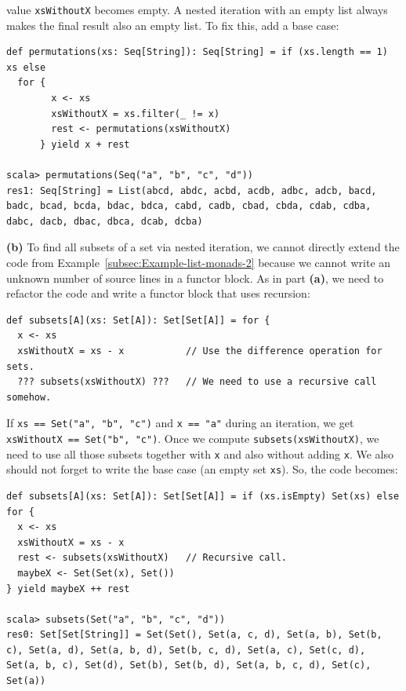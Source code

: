 value \lstinline!xsWithoutX! becomes empty. A nested iteration with
an empty list always makes the final result also an empty list. To
fix this, add a base case:
\begin{lstlisting}
def permutations(xs: Seq[String]): Seq[String] = if (xs.length == 1) xs else
  for {
        x <- xs
        xsWithoutX = xs.filter(_ != x)
        rest <- permutations(xsWithoutX)
      } yield x + rest

scala> permutations(Seq("a", "b", "c", "d"))
res1: Seq[String] = List(abcd, abdc, acbd, acdb, adbc, adcb, bacd, badc, bcad, bcda, bdac, bdca, cabd, cadb, cbad, cbda, cdab, cdba, dabc, dacb, dbac, dbca, dcab, dcba) 
\end{lstlisting}

\textbf{(b)} To find all subsets of a set via nested iteration, we
cannot directly extend the code from Example~\ref{subsec:Example-list-monads-2}
because we cannot write an unknown number of source lines in a functor
block. As in part \textbf{(a)}, we need to refactor the code and write
a functor block that uses recursion:
\begin{lstlisting}
def subsets[A](xs: Set[A]): Set[Set[A]] = for {
  x <- xs
  xsWithoutX = xs - x           // Use the difference operation for sets.
  ??? subsets(xsWithoutX) ???   // We need to use a recursive call somehow.
\end{lstlisting}
If \lstinline!xs == Set("a", "b", "c")! and \lstinline!x == "a"!
during an iteration, we get \lstinline!xsWithoutX == Set("b", "c")!.
Once we compute \lstinline!subsets(xsWithoutX)!, we need to use all
those subsets together with \lstinline!x! and also without adding
\lstinline!x!. We also should not forget to write the base case (an
empty set \lstinline!xs!). So, the code becomes:
\begin{lstlisting}
def subsets[A](xs: Set[A]): Set[Set[A]] = if (xs.isEmpty) Set(xs) else for {
  x <- xs
  xsWithoutX = xs - x
  rest <- subsets(xsWithoutX)   // Recursive call.
  maybeX <- Set(Set(x), Set())
} yield maybeX ++ rest

scala> subsets(Set("a", "b", "c", "d"))
res0: Set[Set[String]] = Set(Set(), Set(a, c, d), Set(a, b), Set(b, c), Set(a, d), Set(a, b, d), Set(b, c, d), Set(a, c), Set(c, d), Set(a, b, c), Set(d), Set(b), Set(b, d), Set(a, b, c, d), Set(c), Set(a)) 
\end{lstlisting}

